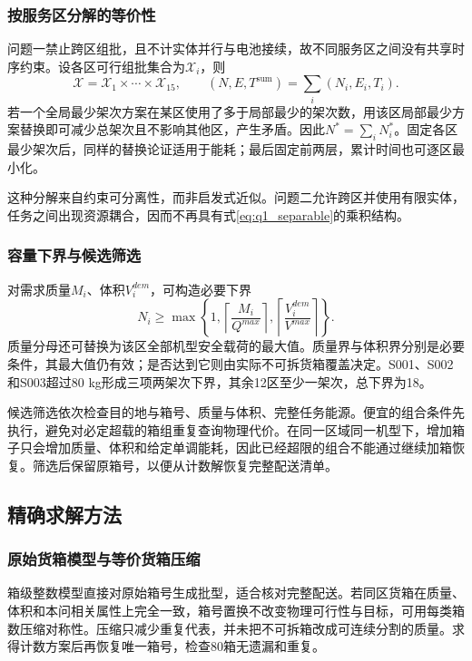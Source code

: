 \documentclass[withoutpreface,colorprint]{format}
\numberwithin{equation}{section}
\numberwithin{figure}{section}
\numberwithin{table}{section}
\begin{document}
\subsubsection{按服务区分解的等价性}
问题一禁止跨区组批，且不计实体并行与电池接续，故不同服务区之间没有共享时序约束。设各区可行组批集合为$\mathcal X_i$，则
\begin{equation}
\mathcal X=\mathcal X_1\times\cdots\times\mathcal X_{15},\qquad
(N,E,T^{\mathrm{sum}})=\sum_i(N_i,E_i,T_i).
\label{eq:q1_separable}
\end{equation}
若一个全局最少架次方案在某区使用了多于局部最少的架次数，用该区局部最少方案替换即可减少总架次且不影响其他区，产生矛盾。因此$N^*=\sum_iN_i^*$。固定各区最少架次后，同样的替换论证适用于能耗；最后固定前两层，累计时间也可逐区最小化。

这种分解来自约束可分离性，而非启发式近似。问题二允许跨区并使用有限实体，任务之间出现资源耦合，因而不再具有式\eqref{eq:q1_separable}的乘积结构。

\subsubsection{容量下界与候选筛选}
对需求质量$M_i$、体积$V_i^{dem}$，可构造必要下界
\begin{equation}
N_i\ge\max\left\{1,\left\lceil\frac{M_i}{Q^{max}}\right\rceil,
\left\lceil\frac{V_i^{dem}}{V^{max}}\right\rceil\right\}.
\label{eq:q1_capacity_lower}
\end{equation}
质量分母还可替换为该区全部机型安全载荷的最大值。质量界与体积界分别是必要条件，其最大值仍有效；是否达到它则由实际不可拆货箱覆盖决定。S001、S002和S003超过80 kg形成三项两架次下界，其余12区至少一架次，总下界为18。

候选筛选依次检查目的地与箱号、质量与体积、完整任务能源。便宜的组合条件先执行，避免对必定超载的箱组重复查询物理代价。在同一区域同一机型下，增加箱子只会增加质量、体积和给定单调能耗，因此已经超限的组合不能通过继续加箱恢复。筛选后保留原箱号，以便从计数解恢复完整配送清单。


\subsection{精确求解方法}
\subsubsection{原始货箱模型与等价货箱压缩}
箱级整数模型直接对原始箱号生成批型，适合核对完整配送。若同区货箱在质量、体积和本问相关属性上完全一致，箱号置换不改变物理可行性与目标，可用每类箱数压缩对称性。压缩只减少重复代表，并未把不可拆箱改成可连续分割的质量。求得计数方案后再恢复唯一箱号，检查80箱无遗漏和重复。
\end{document}
